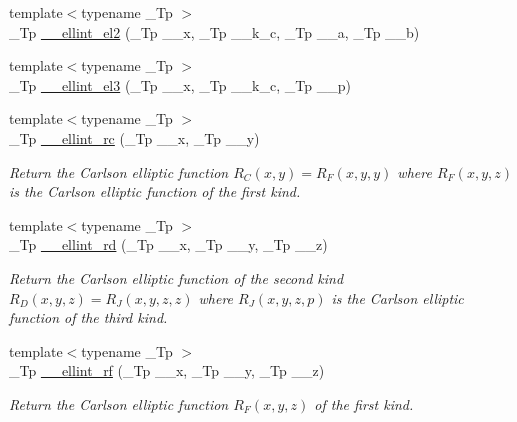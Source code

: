 \begin{DoxyCompactItemize}
\item 
{\footnotesize template$<$typename \+\_\+\+Tp $>$ }\\\+\_\+\+Tp \hyperlink{namespacestd_1_1____detail_a82449d0f05d40ba2cef6b8fc57dd5bae}{\+\_\+\+\_\+ellint\+\_\+el2} (\+\_\+\+Tp \+\_\+\+\_\+x, \+\_\+\+Tp \+\_\+\+\_\+k\+\_\+c, \+\_\+\+Tp \+\_\+\+\_\+a, \+\_\+\+Tp \+\_\+\+\_\+b)
\item 
{\footnotesize template$<$typename \+\_\+\+Tp $>$ }\\\+\_\+\+Tp \hyperlink{namespacestd_1_1____detail_a2a2b5b80edd39b3d1f852f10c5f277fc}{\+\_\+\+\_\+ellint\+\_\+el3} (\+\_\+\+Tp \+\_\+\+\_\+x, \+\_\+\+Tp \+\_\+\+\_\+k\+\_\+c, \+\_\+\+Tp \+\_\+\+\_\+p)
\item 
{\footnotesize template$<$typename \+\_\+\+Tp $>$ }\\\+\_\+\+Tp \hyperlink{namespacestd_1_1____detail_aa7d81e41240a6d031414c6b117889e36}{\+\_\+\+\_\+ellint\+\_\+rc} (\+\_\+\+Tp \+\_\+\+\_\+x, \+\_\+\+Tp \+\_\+\+\_\+y)
\begin{DoxyCompactList}\small\item\em Return the Carlson elliptic function $ R_C(x,y) = R_F(x,y,y) $ where $ R_F(x,y,z) $ is the Carlson elliptic function of the first kind. \end{DoxyCompactList}\item 
{\footnotesize template$<$typename \+\_\+\+Tp $>$ }\\\+\_\+\+Tp \hyperlink{namespacestd_1_1____detail_ac05883415a662fc6f9855dd8d1da921f}{\+\_\+\+\_\+ellint\+\_\+rd} (\+\_\+\+Tp \+\_\+\+\_\+x, \+\_\+\+Tp \+\_\+\+\_\+y, \+\_\+\+Tp \+\_\+\+\_\+z)
\begin{DoxyCompactList}\small\item\em Return the Carlson elliptic function of the second kind $ R_D(x,y,z) = R_J(x,y,z,z) $ where $ R_J(x,y,z,p) $ is the Carlson elliptic function of the third kind. \end{DoxyCompactList}\item 
{\footnotesize template$<$typename \+\_\+\+Tp $>$ }\\\+\_\+\+Tp \hyperlink{namespacestd_1_1____detail_a2cca271dcbdf22923219eab7a02450d5}{\+\_\+\+\_\+ellint\+\_\+rf} (\+\_\+\+Tp \+\_\+\+\_\+x, \+\_\+\+Tp \+\_\+\+\_\+y, \+\_\+\+Tp \+\_\+\+\_\+z)
\begin{DoxyCompactList}\small\item\em Return the Carlson elliptic function $ R_F(x,y,z) $ of the first kind. \end{DoxyCompactList}\item 

\end{DoxyCompactItemize}
